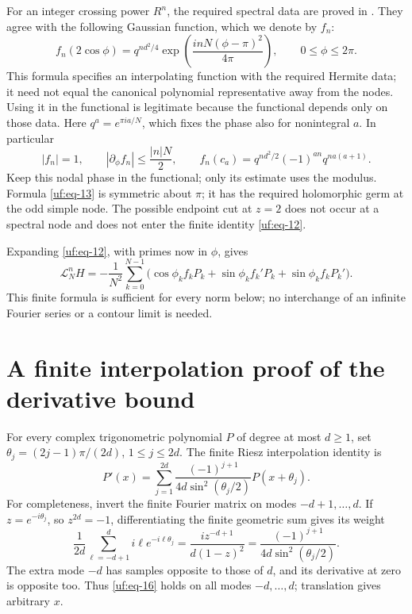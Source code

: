 For an integer crossing power $R^n$, the required spectral data are
proved in \cite[Proposition 5.1]{Finite}. They agree with the following
Gaussian function, which we denote by $f_n$:
\begin{equation}\label{uf:eq-13}
f_n(2\cos\phi)=q^{nd^2/4}
          \exp\left(\frac{inN(\phi-\pi)^2}{4\pi}\right),
 \qquad 0\le\phi\le2\pi.
\end{equation} This formula specifies an interpolating function with the required
Hermite data; it need not equal the canonical polynomial representative
away from the nodes. Using it in the functional is legitimate because
the functional depends only on those data. Here $q^a=e^{\pi ia/N}$,
which fixes the phase also for nonintegral $a$. In particular \begin{equation}\label{uf:eq-14}
|f_n|=1,\qquad |\partial_\phi f_n|\le\frac{|n|N}{2},\qquad
 f_n(c_a)=q^{nd^2/2}(-1)^{an}q^{na(a+1)}.
\end{equation} Keep this nodal phase in the functional; only its estimate uses the modulus. Formula \eqref{uf:eq-13} is symmetric about \(\pi\); it
has the required holomorphic germ at the odd simple node. The possible
endpoint cut at \(z=2\) does not occur at a spectral node and does not
enter the finite identity \eqref{uf:eq-12}.

Expanding \eqref{uf:eq-12}, with primes now in \(\phi\), gives \begin{equation}\label{uf:eq-15}
\mathcal L_N^{n}H=-\frac1{N^2}\sum_{k=0}^{N-1}
       \bigl(\cos\phi_k f_kP_k+
        \sin\phi_k f_k'P_k+\sin\phi_k f_kP_k'\bigr).
\end{equation} This finite formula is sufficient for every norm below; no
interchange of an infinite Fourier series or a contour limit is needed.

\section{A finite interpolation proof of the derivative bound}\label{uf:sec-an-elementary-exact-derivative-inequality}

For every complex trigonometric polynomial \(P\) of degree at most
\(d\ge1\), set \(\theta_j=(2j-1)\pi/(2d)\), \(1\le j\le2d\). The finite
Riesz interpolation identity is \begin{equation}\label{uf:eq-16}
P'(x)=\sum_{j=1}^{2d}
       \frac{(-1)^{j+1}}{4d\sin^2(\theta_j/2)}P(x+\theta_j).
\end{equation} For completeness, invert the finite Fourier matrix on modes
\(-d+1,\ldots,d\). If \(z=e^{-i\theta_j}\), so \(z^{2d}=-1\),
differentiating the finite geometric sum gives its weight \begin{equation}\label{uf:eq-17}
\frac1{2d}\sum_{\ell=-d+1}^{d}i\ell e^{-i\ell\theta_j}
 =\frac{i z^{-d+1}}{d(1-z)^2}
 =\frac{(-1)^{j+1}}{4d\sin^2(\theta_j/2)}.
\end{equation} The extra mode \(-d\) has samples opposite to those of \(d\), and its
derivative at zero is opposite too. Thus \eqref{uf:eq-16} holds on all modes
\(-d,\ldots,d\); translation gives arbitrary \(x\).

